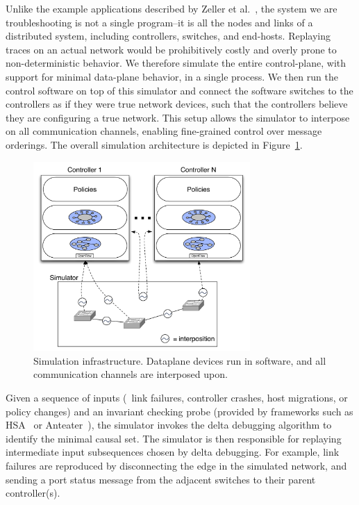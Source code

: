 Unlike the example applications described
by Zeller et al.~\cite{Zeller:2002:SIF:506201.506206}, the system we are troubleshooting is not a
single program--it is all the nodes and links of a distributed system,
including controllers, switches, and end-hosts. Replaying traces
on an actual network would be prohibitively costly and overly prone to
non-deterministic behavior. We therefore simulate the entire control-plane,
with support for minimal data-plane behavior,
in a single process. We then run the control software on
top of this simulator and connect the software switches to the controllers as if they were true
network devices, such that the controllers believe they are configuring a true
network. This setup allows the simulator to interpose on all communication
channels, enabling fine-grained control over message orderings. The overall
simulation architecture is depicted in
Figure~\ref{fig:architecture}.

\begin{figure}[t]
    \includegraphics[width=3.25in]{../diagrams/architecture/Debugger_Architecture.pdf}
    \caption[]{\label{fig:architecture} Simulation infrastructure. Dataplane
    devices run in software, and all communication channels are
    interposed upon.}
\end{figure}

Given a sequence of inputs (\eg~link failures, controller crashes, host migrations,
or policy changes) and an invariant checking probe (provided by frameworks
such as HSA~\cite{hsa,hsa_realtime} or Anteater~\cite{anteater,khurshid2012veriflow}), the simulator invokes
the delta debugging algorithm to identify the minimal causal set. The
simulator is then responsible for replaying intermediate input subsequences
chosen by delta debugging. For example, link failures are
reproduced by disconnecting the edge in the simulated network, and sending a
port status message from the adjacent switches to their parent controller(s).

